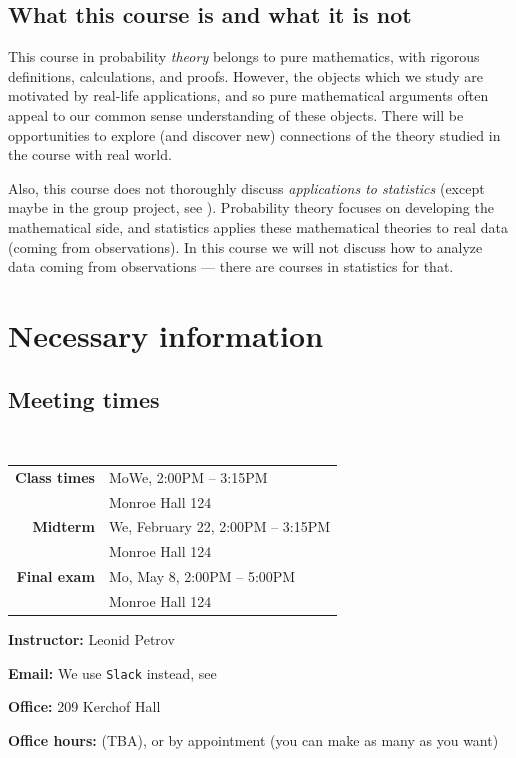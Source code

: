 \documentclass[oneside,11pt]{amsart}
\newcommand{\note}[1]{{\sf{}\color{blue}(#1)}}
\begin{document}
\subsection*{What this course is and what it is not}

This course in probability \emph{theory} belongs to pure mathematics, with
rigorous definitions, calculations, and proofs. However, the objects which we
study are motivated by real-life applications, and so pure mathematical
arguments often appeal to our common sense understanding of these objects.
There will be opportunities to explore (and discover new) connections of the
theory studied in the course with real world.

Also, this course does not thoroughly discuss \emph{applications to statistics}
(except maybe in the group project, see ).  Probability
theory focuses on developing the mathematical side, and statistics applies
these mathematical theories to real data (coming from observations). In this
course we will not discuss how to analyze data coming from observations ---
there are courses in statistics for that.

\section{Necessary information}

\subsection{Meeting times}{\ }\\

\begin{tabular}{|r|l|}
	\hline
	\textbf{Class times}  & MoWe, 2:00PM -- 3:15PM
                       \\  & Monroe Hall 124
                       \\ \hline
	\textbf{Midterm}   & We, February 22, 2:00PM -- 3:15PM
                       \\  & Monroe Hall 124
                       \\ \hline
	\textbf{Final exam}   & Mo, May 8, 2:00PM -- 5:00PM
                       \\  & Monroe Hall 124
                       \\ \hline
\end{tabular}
\hspace{10pt}\parbox{.42\textwidth}
{

	\textbf{Instructor:} Leonid Petrov

	\textbf{Email:} We use \texttt{Slack} instead, see 

	\textbf{Office:} 209 Kerchof Hall

	\textbf{Office hours:} \note{TBA},
	or by appointment (you can make as many as you want)
}
\end{document}
